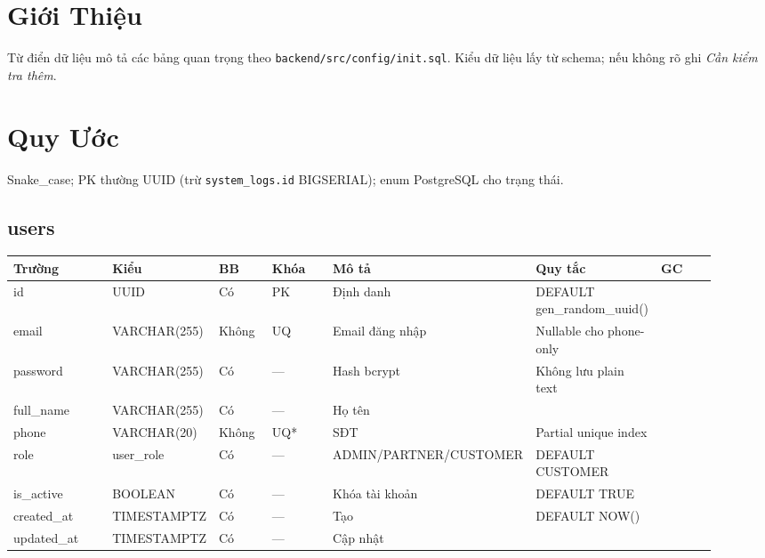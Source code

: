 \section{Giới Thiệu}
Từ điển dữ liệu mô tả các bảng quan trọng theo \texttt{backend/src/config/init.sql}. Kiểu dữ liệu lấy từ schema; nếu không rõ ghi \textit{Cần kiểm tra thêm}.

\section{Quy Ước}
Snake\_case; PK thường UUID (trừ \texttt{system\_logs.id} BIGSERIAL); enum PostgreSQL cho trạng thái.

\newcommand{\dicttable}[1]{\subsection{#1}}
\newcommand{\dicthead}{\begin{longtable}{>{\raggedright\arraybackslash}p{0.16\linewidth}>{\raggedright\arraybackslash}p{0.12\linewidth}>{\raggedright\arraybackslash}p{0.08\linewidth}>{\raggedright\arraybackslash}p{0.10\linewidth}>{\raggedright\arraybackslash}p{0.22\linewidth}>{\raggedright\arraybackslash}p{0.14\linewidth}>{\raggedright\arraybackslash}p{0.10\linewidth}}
\toprule
\textbf{Trường} & \textbf{Kiểu} & \textbf{BB} & \textbf{Khóa} & \textbf{Mô tả} & \textbf{Quy tắc} & \textbf{GC}\\
\midrule
\endhead}
\newcommand{\dictfoot}{\bottomrule\end{longtable}}

\dicttable{users}
\small\dicthead
id & UUID & Có & PK & Định danh & DEFAULT gen\_random\_uuid() & \\
email & VARCHAR(255) & Không & UQ & Email đăng nhập & Nullable cho phone-only & \\
password & VARCHAR(255) & Có & — & Hash bcrypt & Không lưu plain text & \\
full\_name & VARCHAR(255) & Có & — & Họ tên & & \\
phone & VARCHAR(20) & Không & UQ* & SĐT & Partial unique index & \\
role & user\_role & Có & — & ADMIN/PARTNER/CUSTOMER & DEFAULT CUSTOMER & \\
is\_active & BOOLEAN & Có & — & Khóa tài khoản & DEFAULT TRUE & \\
created\_at & TIMESTAMPTZ & Có & — & Tạo & DEFAULT NOW() & \\
updated\_at & TIMESTAMPTZ & Có & — & Cập nhật & & \\
\dictfoot\normalsize

